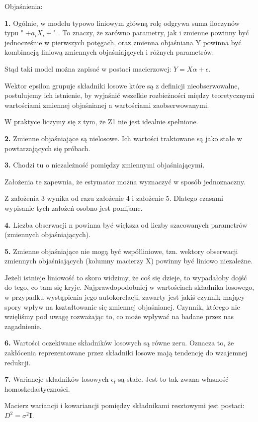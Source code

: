 Objaśnienia:

\textbf{1.} Ogólnie, w modelu typowo liniowym główną rolę odgrywa suma iloczynów typu  " $+ a_iX_i +$" . To znaczy, że zarówno parametry, jak i zmienne powinny być jednocześnie w pierwszych potęgach, oraz zmienna objaśniana Y powinna być kombinacją liniową zmiennych objaśniających i różnych parametrów.

Stąd taki model można zapisać w postaci macierzowej: $Y = X\alpha + \epsilon$.

Wektor epsilon grupuje składniki losowe które są z definicji nieobserwowalne, postulujemy ich istnienie, by wyjaśnić wszelkie rozbieżności między teoretycznymi wartościami zmiennej objaśnianej a wartościami zaobserwowanymi. 

W praktyce liczymy się z tym, że Z1 nie jest idealnie spełnione.

\textbf{2.} Zmienne objaśniające są nielosowe. Ich wartości traktowane są jako stałe w powtarzających się próbach.

\textbf{3.} Chodzi tu o niezależność pomiędzy zmiennymi objaśniającymi.

Założenia te zapewnia, że estymator można wyznaczyć w sposób jednoznaczny.

Z założenia 3 wynika od razu założenie 4 i założenie 5. Dlatego czasami wypisanie tych założeń osobno jest pomijane.

\textbf{4.} Liczba obserwacji n powinna być większa od liczby szacowanych parametrów (zmiennych objaśniających).

\textbf{5.} Zmienne objaśniające nie mogą być współliniowe, tzn. wektory obserwacji zmiennych objaśniających (kolumny macierzy X) powinny być liniowo niezależne.

Jeżeli istnieje liniowość to skoro widzimy, że coś się dzieje, to wypadałoby dojść do tego, co tam się kryje. Najprawdopodobniej w wartościach składnika losowego, w przypadku wystąpienia jego autokorelacji, zawarty jest jakiś czynnik mający spory wpływ na kształtowanie się zmiennej objaśnianej. Czynnik, którego nie wzięliśmy pod uwagę rozważając to, co może wpływać na badane przez nas zagadnienie.

\textbf{6.} Wartości oczekiwane składników losowych są równe zeru. Oznacza to, że zakłócenia reprezentowane przez składniki losowe mają tendencję do wzajemnej redukcji.

\textbf{7.} Wariancje składników losowych $\epsilon_t$ są stałe. Jest to tak zwana własność homoskedastyczności.

Macierz wariancji i kowariancji pomiędzy składnikami resztowymi jest postaci: $D^2 = \sigma^2\textbf{I}$.

